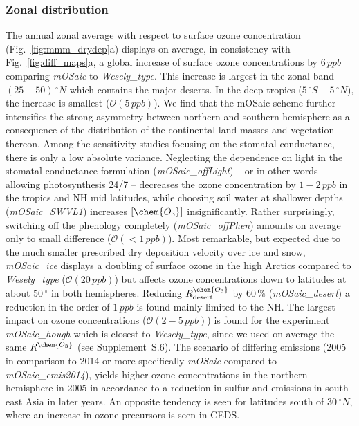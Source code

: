 \documentclass[gmd, manuscript]{copernicus}
\begin{document}
\subsubsection{Zonal distribution}
\label{subsubsec:zonal}
%
The annual zonal average with respect to surface ozone concentration (Fig.~\ref{fig:mmm_drydep}a) displays on average, in consistency with Fig.~\ref{fig:diff_maps}a, a global increase of surface ozone concentrations by $6\,\unit{ppb}$ comparing \emph{mOSaic} to \emph{Wesely\_type}. This increase is largest in the zonal band $(25-50)\,\unit{^\circ N}$ which contains the major deserts. In the deep tropics ($5\,\unit{^\circ S}-5\,\unit{^\circ N}$), the increase is smallest ($\mathcal{O}(5\,\unit{ppb})$). We find that the mOSaic scheme further intensifies the strong asymmetry between northern and southern hemisphere as a consequence of the distribution of the continental land masses and vegetation thereon. Among the sensitivity studies focusing on the stomatal conductance, there is only a low absolute variance. Neglecting the dependence on light in the stomatal conductance formulation (\emph{mOSaic\_offLight}) -- or in other words allowing photosynthesis 24/7 -- decreases the ozone concentration by $1-2\,\unit{ppb}$ in the tropics and NH mid latitudes, while choosing soil water at shallower depths (\emph{mOSaic\_SWVL1}) increases $[\chem{O_3}]$ insignificantly. Rather surprisingly, switching off the phenology completely (\emph{mOSaic\_offPhen}) amounts on average only to small difference ($\mathcal{O}(<1\,\unit{ppb})$). Most remarkable, but expected due to the much smaller prescribed dry deposition velocity over ice and snow, \emph{mOSaic\_ice} displays a doubling of surface ozone in the high Arctics compared to \emph{Wesely\_type} ($\mathcal{O}(20\,\unit{ppb})$) but affects ozone concentrations down to latitudes at about $50\,\unit{^\circ}$ in both hemispheres. Reducing $R^\chem{O_3}_\text{desert}$ by $60\,\unit{\%}$ (\emph{mOSaic\_desert}) a reduction in the order of $1\,\unit{ppb}$ is found mainly limited to the NH. The largest impact on ozone concentrations ($\mathcal{O}(2-5\,\unit{ppb})$) is found for the experiment \emph{mOSaic\_hough} which is closest to \emph{Wesely\_type}, since we used on average the same $R^\chem{O_3}$ (see Supplement~S.6). The scenario of differing emissions (2005 in comparison to 2014 or more specifically \emph{mOSaic} compared to \emph{mOSaic\_emis2014}), yields higher ozone concentrations in the northern hemisphere in 2005 in accordance to a reduction in sulfur and  emissions in south east Asia in later years. An opposite tendency is seen for latitudes south of $30\,\unit{^\circ N}$, where an increase in ozone precursors is seen in CEDS. 
\end{document}
